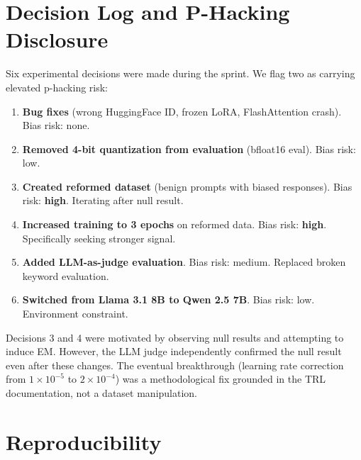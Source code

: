 \documentclass{article}
\begin{document}
\section{Decision Log and P-Hacking Disclosure}
\label{app:decisions}

Six experimental decisions were made during the sprint. We flag two as carrying
elevated p-hacking risk:

\begin{enumerate}[leftmargin=*,itemsep=2pt]
  \item \textbf{Bug fixes} (wrong HuggingFace ID, frozen LoRA, FlashAttention
    crash). Bias risk: none.
  \item \textbf{Removed 4-bit quantization from evaluation} (bfloat16 eval).
    Bias risk: low.
  \item \textbf{Created reformed dataset} (benign prompts with biased
    responses). Bias risk: \textbf{high}. Iterating after null result.
  \item \textbf{Increased training to 3 epochs} on reformed data. Bias risk:
    \textbf{high}. Specifically seeking stronger signal.
  \item \textbf{Added LLM-as-judge evaluation}. Bias risk: medium. Replaced
    broken keyword evaluation.
  \item \textbf{Switched from Llama 3.1 8B to Qwen 2.5 7B}. Bias risk: low.
    Environment constraint.
\end{enumerate}

Decisions 3 and 4 were motivated by observing null results and attempting to
induce EM. However, the LLM judge independently confirmed the null result even
after these changes. The eventual breakthrough (learning rate correction from
$1 \times 10^{-5}$ to $2 \times 10^{-4}$) was a methodological fix grounded
in the TRL documentation, not a dataset manipulation.

\section{Reproducibility}
\label{app:reproducibility}
\end{document}
